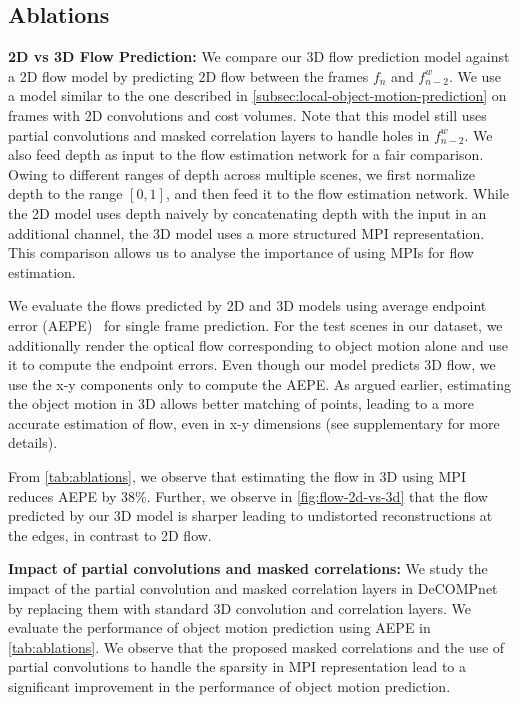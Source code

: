 \documentclass[preprint]{vgtc}
\begin{document}
    \subsection{Ablations}\label{subsec:ablations}
    \textbf{2D vs 3D Flow Prediction:}
    We compare our 3D flow prediction model against a 2D flow model by predicting 2D flow between the frames $f_n$ and $f^w_{n-2}$.
    We use a model similar to the one described in \autoref{subsec:local-object-motion-prediction} on frames with 2D convolutions and cost volumes.
    Note that this model still uses partial convolutions and masked correlation layers to handle holes in $f^w_{n-2}$.
    We also feed depth as input to the flow estimation network for a fair comparison.
    Owing to different ranges of depth across multiple scenes, we first normalize depth to the range $[0,1]$, and then feed it to the flow estimation network.
    While the 2D model uses depth naively by concatenating depth with the input in an additional channel, the 3D model uses a more structured MPI representation.
    This comparison allows us to analyse the importance of using MPIs for flow estimation.


    We evaluate the flows predicted by 2D and 3D models using average endpoint error (AEPE)~\cite{liu2020arflow} for single frame prediction.
    For the test scenes in our dataset, we additionally render the optical flow corresponding to object motion alone and use it to compute the endpoint errors.
    Even though our model predicts 3D flow, we use the x-y components only to compute the AEPE\@.
    As argued earlier, estimating the object motion in 3D allows better matching of points, leading to a more accurate estimation of flow, even in x-y dimensions (see supplementary for more details).

    From \autoref{tab:ablations}, we observe that estimating the flow in 3D using MPI reduces AEPE by 38\%.
    Further, we observe in \autoref{fig:flow-2d-vs-3d} that the flow predicted by our 3D model is sharper leading to undistorted reconstructions at the edges, in contrast to 2D flow.

    \textbf{Impact of partial convolutions and masked correlations:}
    We study the impact of the partial convolution and masked correlation layers in DeCOMPnet by replacing them with standard 3D convolution and correlation layers.
    We evaluate the performance of object motion prediction using AEPE in \autoref{tab:ablations}.
    We observe that the proposed masked correlations and the use of partial convolutions to handle the sparsity in MPI representation lead to a significant improvement in the performance of object motion prediction.
\end{document}
